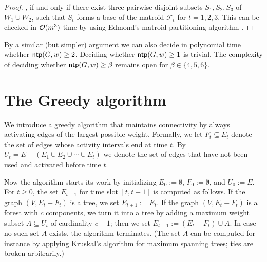 \begin{proof}
, if and only if there exist three pairwise disjoint subsets
$S_1,S_2,S_3$ of $W_1 \cup W_2$, such that $S_t$ forms a base of the matroid $\mathcal{F}_t$ for $t=1,2,3$.
This can be checked in $\mathcal{O}(m^3)$ time by using Edmond's matroid partitioning algorithm \cite{edmonds1965minimum}.
\end{proof}

By a similar (but simpler) argument we can also decide in polynomial time whether $\operatorname{\textsf{ntp}}(G,w)\ge2$.
Deciding whether $\operatorname{\textsf{ntp}}(G,w)\ge1$ is trivial.
The complexity of deciding whether $\operatorname{\textsf{ntp}}(G,w)\ge\beta$ remains open for $\beta\in\{4,5,6\}$.


\section{The Greedy algorithm}
\label{sec:greedy}
We introduce a greedy algorithm that maintains connectivity by always
activating edges of the largest possible weight.
Formally, we let $F_t\subseteq E_t$ denote the set of edges whose activity intervals 
end at time $t$.
By $U_t=E-(E_1\cup E_2\cup\cdots\cup E_t)$ we denote the set of edges that have not been 
used and activated before time $t$.

Now the {\greedy} algorithm starts its work by initializing 
$E_0:=\emptyset$, $F_0:=\emptyset$, and $U_0:=E$.
For $t\ge0$, the set $E_{t+1}$ for time slot $[t,t+1]$ is computed as follows.
If the graph $(V,E_t-F_t)$ is a tree, we set $E_{t+1}:=E_t$.
If the graph $(V,E_t-F_t)$ is a forest with $c$ components, we turn it into 
a tree by adding a maximum weight subset $A\subseteq U_t$ of cardinality $c-1$;
then we set $E_{t+1}:=(E_t-F_t)\cup A$.
In case no such set $A$ exists, the {\greedy} algorithm terminates.
(The set $A$ can be computed for instance by applying Kruskal's algorithm for 
maximum spanning trees; ties are broken arbitrarily.)

